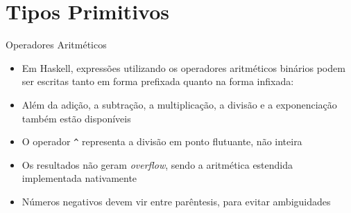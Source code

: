\section{Tipos Primitivos}

\begin{frame}[fragile]{Operadores Aritméticos}

    \begin{itemize}
        \item Em Haskell, expressões utilizando os operadores aritméticos binários podem ser 
            escritas tanto em forma prefixada quanto na forma infixada:


        \item Além da adição, a subtração, a multiplicação, a divisão e a exponenciação
            também estão disponíveis


        \item O operador \texttt{\^} representa a divisão em ponto flutuante, não inteira

        \item Os resultados não geram \textit{overflow}, sendo a aritmética estendida
            implementada nativamente


        \item Números negativos devem vir entre parêntesis, para evitar ambiguidades

    \end{itemize}

\end{frame}

